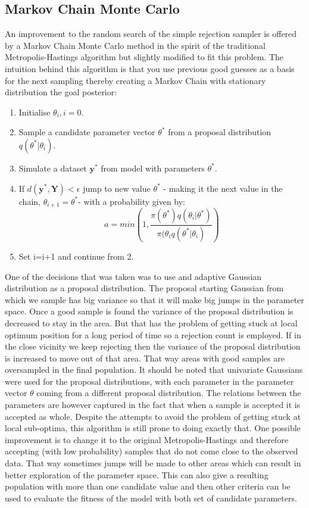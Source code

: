 \documentclass[12pt,a4paper,titlepage]{article}
\begin{document}
\subsection{Markov Chain Monte Carlo}
An improvement to the random search of the simple rejection sampler is offered by a Markov Chain Monte Carlo method in the spirit of the traditional Metropolis-Hastings algorithm but slightly modified to fit this problem\cite{marjoram2003markov}. The intuition behind this algorithm is that you use previous good guesses as a basis for the next sampling thereby creating a Markov Chain with stationary distribution the goal posterior:
\begin{enumerate}[noitemsep]
\item{Initialise $\theta_{i}, i = 0$.}
\item{Sample a candidate parameter vector $\theta^*$ from a proposal distribution $q(\theta^* | \theta_{i})$.}
\item{Simulate a dataset $\mathbf{y}^*$ from model with parameters $\theta^*$.}
\item{If $d(\mathbf{y}^*, \mathbf{Y}) < \epsilon$ jump to new value $\theta^*$ - making it the next value in the chain, $\theta_{i+1} = \theta^*$- with a probability given by:
\begin{equation*}
a = min \left(1, \frac{\pi(\theta^*)q(\theta_{i} | \theta^*)}{\pi(\theta_{i}q(\theta^*|\theta_{i})}\right)
\end{equation*}}
\item{Set i=i+1 and continue from 2.}
\end{enumerate}
One of the decisions that was taken was to use and adaptive Gaussian distribution as a proposal distribution. The proposal starting Gaussian from which we sample has big variance so that it will make big jumps in the parameter space. Once a good sample is found the variance of the proposal distribution is decreased to stay in the area. But that has the problem of getting stuck at local optimum position for a long period of time so a rejection count is employed. If in the close vicinity we keep rejecting then the variance of the proposal distribution is increased to move out of that area. That way areas with good samples are oversampled in the final population. It should be noted that univariate Gaussians were used for the proposal distributions, with each parameter in the parameter vector $\theta$ coming from a different proposal distribution. The relations between the parameters are however captured in the fact that when a sample is accepted it is accepted as whole. Despite the attempts to avoid the problem of getting stuck at local sub-optima, this algorithm is still prone to doing exactly that. One possible improvement is to change it to the original Metropolis-Hastings and therefore accepting (with low probability) samples that do not come close to the observed data. That way sometimes jumps will be made to other areas which can result in better exploration of the parameter space. This can also give a resulting population with more than one candidate value and then other criteria can be used to evaluate the fitness of the model with both set of candidate parameters. 
\end{document}
